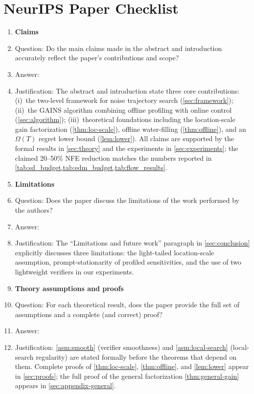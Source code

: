 \section*{NeurIPS Paper Checklist}

\begin{enumerate}

\item {\bf Claims}
\item[] Question: Do the main claims made in the abstract and introduction accurately reflect the paper's contributions and scope?
\item[] Answer: \answerYes{}
\item[] Justification: The abstract and introduction state three core contributions: (i)~the two-level framework for noise trajectory search (\cref{sec:framework}); (ii)~the \textsc{GAINS} algorithm combining offline profiling with online control (\cref{sec:algorithm}); (iii)~theoretical foundations including the location-scale gain factorization (\cref{thm:loc-scale}), offline water-filling (\cref{thm:offline}), and an $\Omega(T)$ regret lower bound (\cref{lem:lower}). All claims are supported by the formal results in \cref{sec:theory} and the experiments in \cref{sec:experiments}; the claimed 20--50\% NFE reduction matches the numbers reported in \cref{tab:sd_budget,tab:edm_budget,tab:flow_results}.

\item {\bf Limitations}
\item[] Question: Does the paper discuss the limitations of the work performed by the authors?
\item[] Answer: \answerYes{}
\item[] Justification: The ``Limitations and future work'' paragraph in \cref{sec:conclusion} explicitly discusses three limitations: the light-tailed location-scale assumption, prompt-stationarity of profiled sensitivities, and the use of two lightweight verifiers in our experiments.

\item {\bf Theory assumptions and proofs}
\item[] Question: For each theoretical result, does the paper provide the full set of assumptions and a complete (and correct) proof?
\item[] Answer: \answerYes{}
\item[] Justification: \cref{asm:smooth} (verifier smoothness) and \cref{asm:local-search} (local-search regularity) are stated formally before the theorems that depend on them. Complete proofs of \cref{thm:loc-scale}, \cref{thm:offline}, and \cref{lem:lower} appear in \cref{sec:proofs}; the full proof of the general factorization \cref{thm:general-gain} appears in \cref{sec:appendix-general}.


\end{enumerate}
